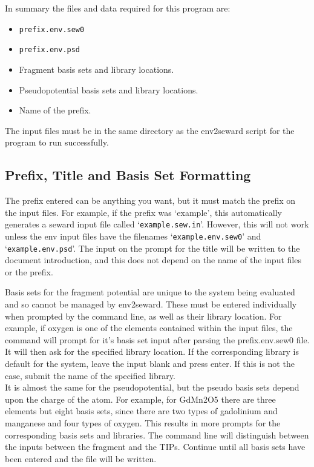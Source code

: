 \documentclass[10pt]{article}
\begin{document}
In summary the files and data required for this program are:
\begin{itemize}
	\item \texttt{prefix.env.sew0}
	\item \texttt{prefix.env.psd}
	\item Fragment basis sets and library locations.
	\item Pseudopotential basis sets and library locations.
	\item Name of the prefix.
\end{itemize}
The input files must be in the same directory as the env2seward script for the program to run successfully.

\subsection{Prefix, Title and Basis Set Formatting}

The prefix entered can be anything you want, but it must match the prefix on the input files. For example, if the prefix was `example', this automatically generates a seward input file called `\texttt{example.sew.in}'. However, this will not work unless the env input files have the filenames `\texttt{example.env.sew0}' and `\texttt{example.env.psd}'. The input on the prompt for the title will be written to the document introduction, and this does not depend on the name of the input files or the prefix.

Basis sets for the fragment potential are unique to the system being evaluated and so cannot be managed by env2seward. These must be entered individually when prompted by the command line, as well as their library location. For example, if oxygen is one of the elements contained within the input files, the command will prompt for it's basis set input after parsing the prefix.env.sew0 file. It will then ask for the specified library location. If the corresponding library is default for the system, leave the input blank and press enter. If this is not the case, submit the name of the specified library.
\\
It is almost the same for the pseudopotential, but the pseudo basis sets depend upon the charge of the atom. For example, for GdMn2O5 there are three elements but eight basis sets, since there are two types of gadolinium and manganese and four types of oxygen. This results in more prompts for the corresponding basis sets and libraries. The command line will distinguish between the inputs between the fragment and the TIPs. Continue until all basis sets have been entered and the file will be written.
\end{document}
